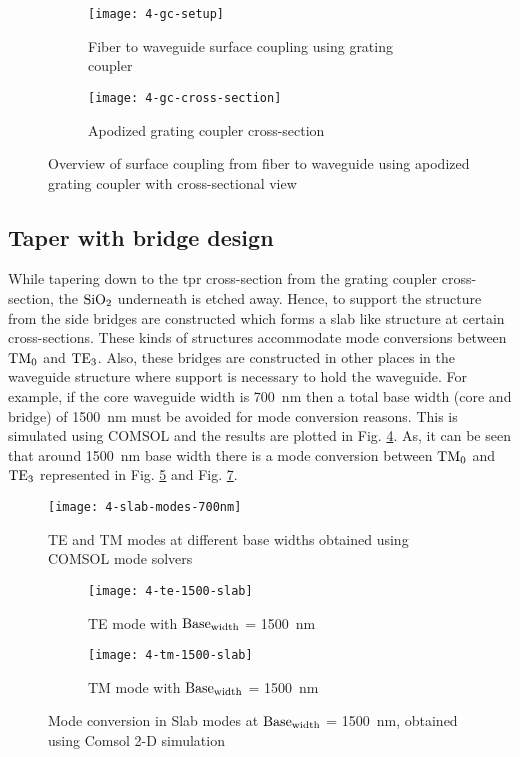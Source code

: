 \documentclass[../report.tex]{subfiles}
\begin{document}
\begin{figure}[H] %
	\begin{subfigure}[t]{0.45\textwidth}
		\texttt{[image: 4-gc-setup]}
		\caption{Fiber to waveguide surface coupling using grating coupler}
		\label{fig:4_gc_setup}
	\end{subfigure}
	\hfill
	\begin{subfigure}[t]{0.45\textwidth}
		\texttt{[image: 4-gc-cross-section]}
		\caption{Apodized grating coupler cross-section}
		\label{fig:4_gc_cross_section}
	\end{subfigure}
	\caption{Overview of surface coupling from fiber to waveguide using apodized grating coupler with cross-sectional view}
\end{figure}


\subsection{Taper with bridge design}
While tapering down to the \gls{tpr} cross-section from the grating coupler cross-section, the $\mathrm{SiO_{2}}$ underneath is etched away. Hence, to support the structure from the side bridges are constructed which forms a slab like structure at certain cross-sections. These kinds of structures accommodate mode conversions between $\mathrm{TM_0}$ and $\mathrm{TE_3}$. Also, these bridges are constructed in other places in the waveguide structure where support is necessary to hold the waveguide. For example, if the core waveguide width is \SI{700}{\nano\meter} then a total base width (core and bridge) of \SI{1500}{\nano\meter} must be avoided for mode conversion reasons. This is simulated using COMSOL and the results are plotted in Fig. \ref{fig:4_slab_modes_700nm}. As, it can be seen that around \SI{1500}{\nano\meter} base width there is a mode conversion between $\mathrm{TM_0}$ and $\mathrm{TE_3}$ represented in Fig. \ref{fig:4_te_1500_slab} and Fig. \ref{fig:4_tm_1500_slab}. 
 
 \begin{figure}[H] %
 	\centering
 	\texttt{[image: 4-slab-modes-700nm]}
 	\caption{TE and TM modes at different base widths obtained using COMSOL mode solvers}
 	\label{fig:4_slab_modes_700nm}
 \end{figure}
 
 \begin{figure}[H] %
 	\begin{subfigure}[t]{0.45\textwidth}
 		\texttt{[image: 4-te-1500-slab]}
 		\caption{TE mode with $\mathrm{Base_{width}}$ = \SI{1500}{\nano\meter}}
 		\label{fig:4_te_1500_slab}
 	\end{subfigure}
 	\hfill
 	\begin{subfigure}[t]{0.45\textwidth}
 		\texttt{[image: 4-tm-1500-slab]}
 		\caption{TM mode with $\mathrm{Base_{width}}$ = \SI{1500}{\nano\meter}}
 		\label{fig:4_tm_1500_slab}
 	\end{subfigure}
 	\caption{Mode conversion in Slab modes at $\mathrm{Base_{width}}$ = \SI{1500}{\nano\meter}, obtained using Comsol 2-D simulation}
 \end{figure}
\end{document}
